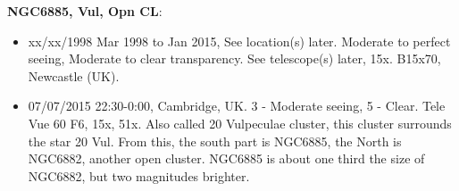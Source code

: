{\bf NGC6885, Vul, Opn CL}:
\begin{itemize}
\item xx/xx/1998 Mar 1998 to Jan 2015, See location(s) later. Moderate to perfect seeing, Moderate to clear transparency. See telescope(s) later, 15x. B15x70, Newcastle (UK).
\item 07/07/2015 22:30-0:00, Cambridge, UK. 3 - Moderate seeing, 5 - Clear. Tele Vue 60 F6, 15x, 51x. Also called 20 Vulpeculae cluster, this cluster surrounds the star 20 Vul. From this, the south part is NGC6885, the North is NGC6882, another open cluster. NGC6885 is about one third the size of NGC6882, but two magnitudes brighter.
\end{itemize}
